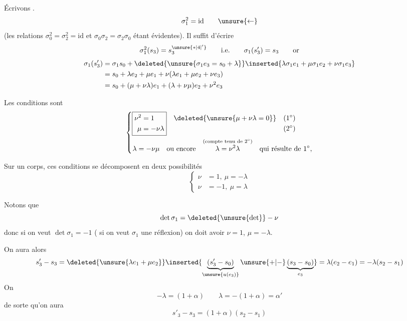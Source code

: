 Écrivons .
\[
\sigma_1^2=\mathrm{id}\qquad\unsure{\leftarrow}
\]
(les relations $\sigma_0^2=\sigma_2^2=\mathrm{id}$ et $\sigma_0\sigma_2=\sigma_2\sigma_0$ étant évidentes). Il suffit d'écrire
\[
\sigma_1^2(s_3)=s_3^{\unsure{*|4|' }}\qquad\text{i.e.}\qquad\sigma_1(s'_3)=s_3\qquad\text{or}
\]
\[
\begin{aligned}
\sigma_1(s'_3)&=\sigma_1s_0+\deleted{\unsure{\sigma_1e_3=s_0+\lambda}}\inserted{\lambda\sigma_1e_1+\mu\sigma_1e_2+\nu\sigma_1e_3}\\
&=s_0+\lambda e_2+\mu e_1+\nu(\lambda e_1+\mu e_2+\nu e_3)\\
&=s_0+(\mu+\nu\lambda)e_1+(\lambda+\nu\mu)e_2+\nu^2e_3
\end{aligned}
\]
\margin{$\lambda\ \mu\ \nu$}

Les conditions sont
\[
\left\{\begin{aligned}
\boxed{\begin{aligned}\nu^2&=1\\\mu&=-\nu\lambda\end{aligned}}
&\quad\begin{aligned}\deleted{\unsure{\mu+\nu\lambda=0}}\quad &(1^\circ)\\ &(2^\circ)\end{aligned}\\
\lambda=-\nu\mu\quad&\text{ou encore}\quad
\overset{\text{(compte tenu de }2^\circ\text{)}}{\lambda=\nu^2\lambda}\quad\text{qui résulte de }1^\circ,
\end{aligned}\right.
\]

Sur un corps, ces conditions se décomposent en deux possibilités
\[
\left\{\begin{aligned}\nu&=1,\ \mu=-\lambda\\\nu&=-1,\ \mu=\lambda\end{aligned}\right.
\]

Notons que
\[
\det\sigma_1=\deleted{\unsure{\det}}-\nu
\]
donc si on veut $\det\sigma_1=-1$ ( si on veut $\sigma_1$ une réflexion) on doit avoir $\nu=1$, $\mu=-\lambda$.

On aura alors 
\[
s'_3-s_3=\deleted{\unsure{\lambda e_1+\mu e_2}}\inserted{\underbrace{(s'_3-s_0)}_{\unsure{u(e_3)}}\unsure{+|-}\underbrace{(s_3-s_0)}_{e_3}}=\lambda(e_2-e_1)=-\lambda(s_2-s_1)
\]
On 
\[
-\lambda=(1+\alpha)\qquad\lambda=-(1+\alpha)=\alpha'\tag*{(1)}
\]
de sorte qu'on aura
\[
s'_3-s_3=(1+\alpha)(s_2-s_1)\tag*{(2)}
\]
